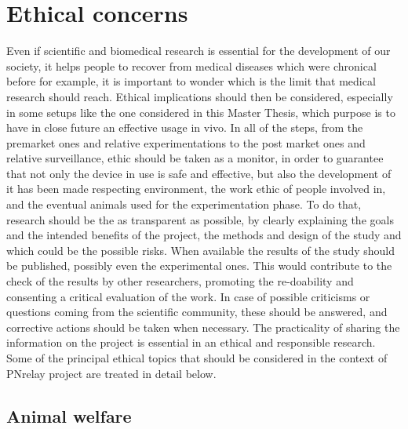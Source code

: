 \documentclass{Configuration_Files/PoliMi3i_thesis}
\begin{document}
\section{Ethical concerns}

Even if scientific and biomedical research is essential for the development of our society, it helps people to recover from medical diseases which were chronical before for example, it is important to wonder which is the limit that medical research should reach.
Ethical implications should then be considered, especially in some setups like the one considered in this Master Thesis, which purpose is to have in close future an effective usage in vivo.
In all of the steps, from the premarket ones and relative experimentations to the post market ones and relative surveillance, ethic should be taken as a monitor, in order to guarantee that not only the device in use is safe and effective, but also the development of it has been made respecting environment, the work ethic of people involved in, and the eventual animals used for the experimentation phase. To do that, research should be the as transparent as possible, by clearly explaining the goals and the intended benefits of the project, the methods and design of the study and which could be the possible risks. 
When available the results of the study should be published, possibly even the experimental ones. This would contribute to the check of the results by other researchers, promoting the re-doability and consenting a critical evaluation of the work. In case of possible criticisms or questions coming from the scientific community, these should be answered, and corrective actions should be taken when necessary. The practicality of sharing the information on the project is essential in an ethical and responsible research. 
Some of the principal ethical topics that should be considered in the context of PNrelay project are treated in detail below.


\subsection{Animal welfare }
\end{document}
